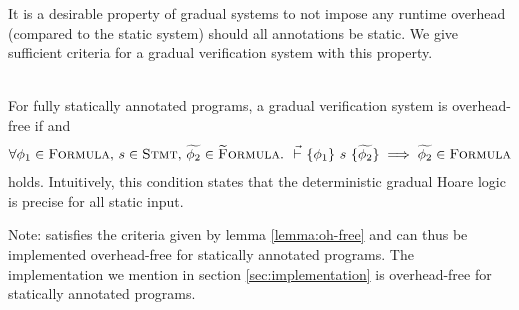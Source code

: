 It is a desirable property of gradual systems to not impose any runtime overhead (compared to the static system) should all annotations be static.
We give sufficient criteria for a gradual verification system with this property.
\begin{lemma}
    \label{lemma:oh-free}~\\
    For fully statically annotated programs, a gradual verification system is overhead-free if  and
    \begin{align}
    \label{lemma-frm:oh-free}
    \forall \phi_1 \in \textup{\textsc{Formula}},\, s \in \textup{\textsc{Stmt}},\, \widetilde{\phi_2} \in \textup{\textsc{\ensuremath{\widetilde{\text{F}}}ormula}}.~ {} \,\,\vec{\vdash}\,\, \{{\phi_1}\} ~{s}~ \{{\widetilde{\phi_2}}\} \implies \widetilde{\phi_2} \in \textup{\textsc{Formula}}
    \end{align}
    holds.
    Intuitively, this condition states that the deterministic gradual Hoare logic is precise for all static input.
    
\end{lemma}

Note: \gvlidf satisfies the criteria given by lemma \ref{lemma:oh-free} and can thus be implemented overhead-free for statically annotated programs.
The implementation we mention in section \ref{sec:implementation} is overhead-free for statically annotated programs.

